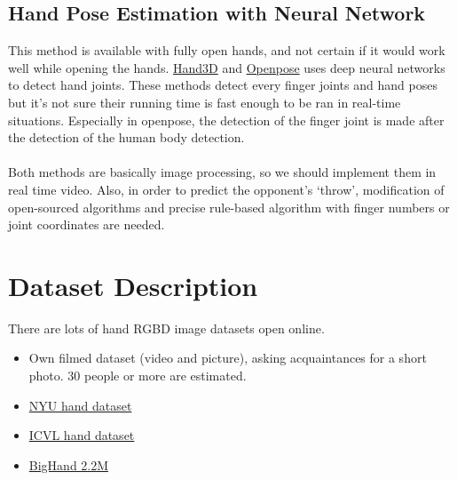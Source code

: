 \documentclass[10pt,twocolumn,letterpaper]{article}
\begin{document}
\subsection{Hand Pose Estimation with Neural Network}
This method is available with fully open hands, and not certain if it would work well while opening the hands. \href{https://arxiv.org/pdf/1704.02224.pdf}{Hand3D} and \href{https://arxiv.org/pdf/1611.08050.pdf}{Openpose} uses deep neural networks to detect hand joints. 
These methods detect every finger joints and hand poses but it’s not sure their running time is fast enough to be ran in real-time situations. Especially in openpose, the detection of the finger joint is made after the detection of the human body detection.
\paragraph{}
Both methods are basically image processing, so we should implement them in real time video. Also, in order to predict the opponent’s ‘throw’, modification of open-sourced algorithms and precise rule-based algorithm with finger numbers or joint coordinates are needed.

\section{Dataset Description}
There are lots of hand RGBD image datasets open online.
\begin{itemize}
\item Own filmed dataset (video and picture), asking acquaintances for a short photo. 30 people or more are estimated.
\item \href{https://cims.nyu.edu/~tompson/NYU_Hand_Pose_Dataset.htm}{NYU hand dataset} 
\item \href{http://icvl.ee.ic.ac.uk/hands17/challenge/}{ICVL hand dataset} 
\item \href{https://arxiv.org/pdf/1704.02612.pdf}{BigHand 2.2M} 
\end{itemize}
\end{document}
